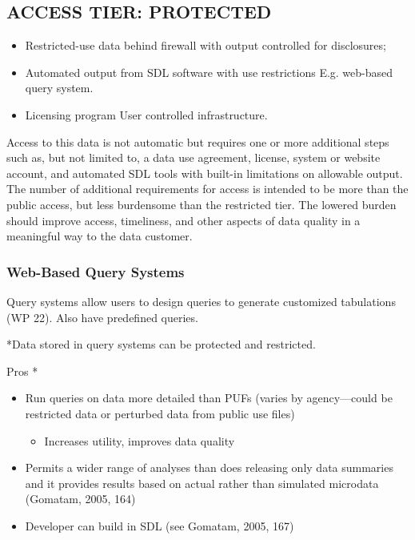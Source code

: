 \subsection{ACCESS TIER: PROTECTED}
\begin{itemize}
\item{Restricted-use data behind firewall with output controlled for disclosures};
\item{Automated output from SDL software with use restrictions} E.g. web-based query system.
\item{Licensing program} User controlled infrastructure.
\end{itemize}

Access to this data is not automatic but requires one or more additional steps such as, but not limited to, a data use agreement, license, system or website account, and automated SDL tools with built-in limitations on allowable output. The number of additional requirements for access is intended to be more than the public access, but less burdensome than the restricted tier. The lowered burden should improve access, timeliness, and other aspects of data quality in a meaningful way to the data customer.

\subsubsection{Web-Based Query Systems} 
Query systems allow users to design queries to generate customized tabulations (WP 22). Also have predefined queries.

*Data stored in query systems can be protected and restricted.

Pros *
\begin{itemize}
\item 	Run queries on data more detailed than PUFs (varies by agency—could be restricted data or perturbed data from public use files) 
\begin{itemize}
    \item Increases utility, improves data quality
\end{itemize}	
\item 	Permits a wider range of analyses than does releasing only data summaries and it provides results based on actual rather than simulated microdata (Gomatam, 2005, 164)
\item 	Developer can build in SDL (see Gomatam, 2005, 167)
\end{itemize}

